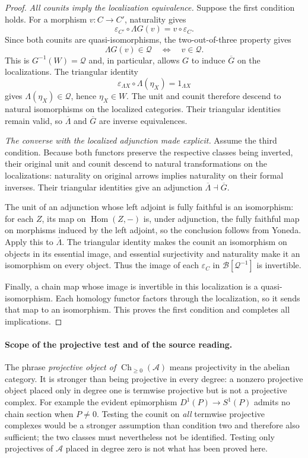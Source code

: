\begin{proof}
\emph{All counits imply the localization equivalence.}
Suppose the first condition holds.  For a morphism $v:C\to C'$,
naturality gives
\[
 \varepsilon_{C'}\circ\Lambda G(v)=v\circ\varepsilon_C.
\]
Since both counits are quasi-isomorphisms, the two-out-of-three
property gives
\[
 \Lambda G(v)\in\mathcal Q
       \quad\Longleftrightarrow\quad v\in\mathcal Q.
\]
This is $G^{-1}(W)=\mathcal Q$ and, in particular, allows $G$ to
induce $\overline G$ on the localizations.  The triangular identity
\[
 \varepsilon_{\Lambda X}\circ\Lambda(\eta_X)
       =1_{\Lambda X}
\]
gives $\Lambda(\eta_X)\in\mathcal Q$, hence $\eta_X\in W$.
The unit and counit therefore descend to natural isomorphisms on the
localized categories.  Their triangular identities remain valid,
so $\overline\Lambda$ and $\overline G$ are inverse equivalences.

\emph{The converse with the localized adjunction made explicit.}
Assume the third condition.  Because both functors preserve the
respective classes being inverted, their original unit and counit
descend to natural transformations on the localizations: naturality
on original arrows implies naturality on their formal inverses.
Their triangular identities give an adjunction
$\overline\Lambda\dashv\overline G$.

The unit of an adjunction whose left adjoint is fully faithful is an
isomorphism: for each $Z$, its map on $\operatorname{Hom}(Z,-)$ is,
under adjunction, the fully faithful map on morphisms induced by the
left adjoint, so the conclusion follows from Yoneda.  Apply this to
$\overline\Lambda$.  The triangular identity makes the counit an
isomorphism on objects in its essential image, and essential
surjectivity and naturality make it an isomorphism on every object.
Thus the image of each $\varepsilon_C$ in
$\mathcal B[\mathcal Q^{-1}]$ is invertible.

Finally, a chain map whose image is invertible in this localization
is a quasi-isomorphism.  Each homology functor factors through the
localization, so it sends that map to an isomorphism.  This proves
the first condition and completes all implications.
\end{proof}

\paragraph{Scope of the projective test and of the source reading.}
The phrase \emph{projective object of
$\operatorname{Ch}_{\geq0}(\mathcal A)$} means projectivity in the
abelian category.  It is stronger than being projective in every
degree: a nonzero projective object placed only in degree one is
termwise projective but is not a projective complex.  For example the
evident epimorphism $D^1(P)\to S^1(P)$ admits no chain section when
$P\ne0$.  Testing the counit on \emph{all} termwise projective
complexes would be a stronger assumption than condition two and
therefore also sufficient; the two classes must nevertheless not be
identified.  Testing only projectives of $\mathcal A$ placed in
degree zero is not what has been proved here.


